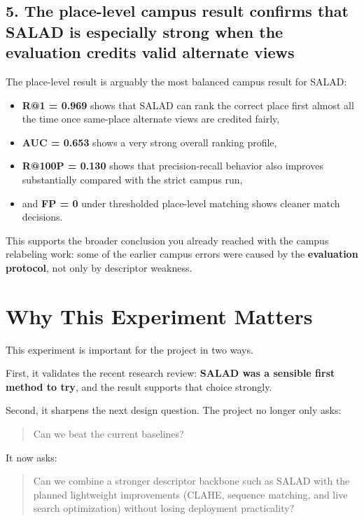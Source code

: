 \documentclass[11pt]{article}
\begin{document}
\subsection*{5. The place-level campus result confirms that SALAD is especially strong when the evaluation credits valid alternate views}
The place-level result is arguably the most balanced campus result for SALAD:
\begin{itemize}[leftmargin=*]
  \item \textbf{R@1 = 0.969} shows that SALAD can rank the correct place first almost all the time once same-place alternate views are credited fairly,
  \item \textbf{AUC = 0.653} shows a very strong overall ranking profile,
  \item \textbf{R@100P = 0.130} shows that precision-recall behavior also improves substantially compared with the strict campus run,
  \item and \textbf{FP = 0} under thresholded place-level matching shows cleaner match decisions.
\end{itemize}

This supports the broader conclusion you already reached with the campus relabeling work: some of the earlier campus errors were caused by the \textbf{evaluation protocol}, not only by descriptor weakness.

\section*{Why This Experiment Matters}
This experiment is important for the project in two ways.

First, it validates the recent research review: \textbf{SALAD was a sensible first method to try}, and the result supports that choice strongly.

Second, it sharpens the next design question. The project no longer only asks:
\begin{quote}
Can we beat the current baselines?
\end{quote}

It now asks:
\begin{quote}
Can we combine a stronger descriptor backbone such as SALAD with the planned lightweight improvements (CLAHE, sequence matching, and live search optimization) without losing deployment practicality?
\end{quote}
\end{document}
